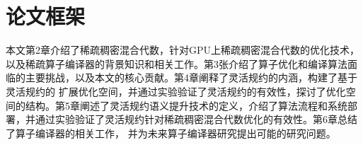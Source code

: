 \section{论文框架}
本文第2章介绍了稀疏稠密混合代数，针对GPU上稀疏稠密混合代数的优化技术，以及稀疏算子编译器的背景知识和相关工作。第3张介绍了算子优化和编译算法面临的主要挑战，以及本文的核心贡献。第4章阐释了灵活规约的内涵，构建了基于灵活规约的
扩展优化空间，并通过实验验证了灵活规约的有效性，探讨了优化空间的结构。第5章阐述了灵活规约语义提升技术的定义，介绍了算法流程和系统部署，并通过实验验证了灵活规约针对稀疏稠密混合代数优化的有效性。第6章总结了算子编译器的相关工作，
并为未来算子编译器研究提出可能的研究问题。
